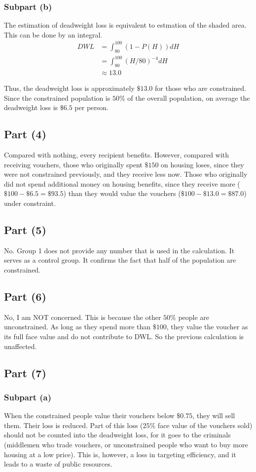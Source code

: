 \documentclass{article}
\begin{document}
\subsubsection{Subpart (b)}
The estimation of deadweight loss is equivalent to estmation of the shaded area. This can be done by an integral.
\begin{align*}
	DWL&=\int_{80}^{100}(1-P(H))dH\\
	&=\int_{80}^{100}(H/80)^{-4}dH\\
	&\approx13.0
\end{align*}

Thus, the deadweight loss is approximately $\$13.0$ for those who are constrained. Since the constrained population is $50\%$ of the overall population, on average the deadweight loss is $\$6.5$ per person.

\subsection{Part (4)}
Compared with nothing, every recipient benefits. However, compared with receiving vouchers, those who originally spent $\$150$ on housing loses, since they were not constrained previously, and they receive less now. Those who originally did not spend additional money on housing benefits, since they receive more ($\$100-\$6.5=\$93.5$) than they would value the vouchers ($\$100-\$13.0=\$87.0$) under constraint.

\subsection{Part (5)}
No. Group 1 does not provide any number that is used in the calculation. It serves as a control group. It confirms the fact that half of the population are constrained.

\subsection{Part (6)}
No, I am NOT concerned. This is because the other $50\%$ people are unconstrained. As long as they spend more than $\$100$, they value the voucher as its full face value and do not contribute to DWL. So the previous calculation is unaffected.

\subsection{Part (7)}
\subsubsection{Subpart (a)}
When the constrained people value their vouchers below $\$0.75$, they will sell them. Their loss is reduced. Part of this loss ($25\%$ face value of the vouchers sold) should not be counted into the deadweight loss, for it goes to the criminals (middlemen who trade vouchers, or unconstrained people who want to buy more housing at a low price). This is, however, a loss in targeting efficiency, and it leads to a waste of public resources.
\end{document}
